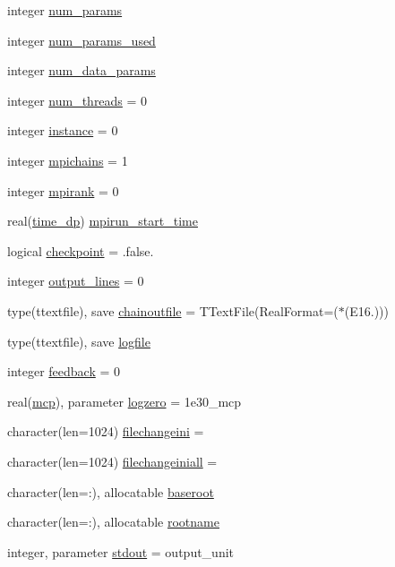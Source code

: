 \begin{DoxyCompactItemize}
\item 
integer \mbox{\hyperlink{namespacesettings_a4faf08502e49a2f851b29d8f7d5fb71d}{num\+\_\+params}}
\item 
integer \mbox{\hyperlink{namespacesettings_ace1e5374df8682e0f85b1b7bcc21451c}{num\+\_\+params\+\_\+used}}
\item 
integer \mbox{\hyperlink{namespacesettings_a588b630a77c6cf16ccd63096b5ac4507}{num\+\_\+data\+\_\+params}}
\item 
integer \mbox{\hyperlink{namespacesettings_a004f5c3efc3e9d33a1a4526f5a20785b}{num\+\_\+threads}} = 0
\item 
integer \mbox{\hyperlink{namespacesettings_a8b396bca0192e0a92363a9cf6b942542}{instance}} = 0
\item 
integer \mbox{\hyperlink{namespacesettings_a9cb321eeb7d7d329d5d99cba2595330d}{mpichains}} = 1
\item 
integer \mbox{\hyperlink{namespacesettings_ad6fd77f9480fb92754b6f5890017e594}{mpirank}} = 0
\item 
real(\mbox{\hyperlink{namespacesettings_a3d81f31b9e0eef8de19fb9b016043af7}{time\+\_\+dp}}) \mbox{\hyperlink{namespacesettings_afe15c9b4b37c62135a2e5d12810b92bc}{mpirun\+\_\+start\+\_\+time}}
\item 
logical \mbox{\hyperlink{namespacesettings_ae0817081d233f3c5d76fad556a766afb}{checkpoint}} = .false.
\item 
integer \mbox{\hyperlink{namespacesettings_a8d398d8d6e0a5435eb847608d0147f12}{output\+\_\+lines}} = 0
\item 
type(ttextfile), save \mbox{\hyperlink{namespacesettings_a45cb647c4940062ae812ef3a374e5e2f}{chainoutfile}} = T\+Text\+File(Real\+Format=\textquotesingle{}($\ast$(E16.))\textquotesingle{})
\item 
type(ttextfile), save \mbox{\hyperlink{namespacesettings_abf81803341f16be48aa42058423f085b}{logfile}}
\item 
integer \mbox{\hyperlink{namespacesettings_a34e44606ac3e84f06e2696f74542f664}{feedback}} = 0
\item 
real(\mbox{\hyperlink{namespacesettings_a341fa0fe410054f78630c33e118669bf}{mcp}}), parameter \mbox{\hyperlink{namespacesettings_a057b984bb501467c33dbcc3ffc3a34d3}{logzero}} = 1e30\+\_\+mcp
\item 
character(len=1024) \mbox{\hyperlink{namespacesettings_ae3545d47de8db723b192e3bc79f95e99}{filechangeini}} = \textquotesingle{}\textquotesingle{}
\item 
character(len=1024) \mbox{\hyperlink{namespacesettings_aa364554c9b5868156913823eaa6b5185}{filechangeiniall}} = \textquotesingle{}\textquotesingle{}
\item 
character(len=\+:), allocatable \mbox{\hyperlink{namespacesettings_aa942779910692a37fbc12dd25f62877e}{baseroot}}
\item 
character(len=\+:), allocatable \mbox{\hyperlink{namespacesettings_a4a3bc0d40d0532bc2f7f2cc87170068a}{rootname}}
\item 
integer, parameter \mbox{\hyperlink{namespacesettings_af5b1a69ec3d96be977d23b1e59e7d36e}{stdout}} = output\+\_\+unit
\end{DoxyCompactItemize}


